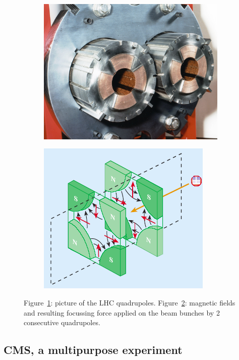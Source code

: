 	\begin{figure}[!h]
		\begin{subfigure}{0.5\linewidth}
			\centering
			\includegraphics[width = 0.5\plotwidth]{fig/chapt2/LHC-quadrupole.jpg}
			\caption{\label{fig:LHCQuadrupole:A}}
		\end{subfigure}
		\begin{subfigure}{0.5\linewidth}
			\centering
			\includegraphics[width = 0.5\plotwidth]{fig/chapt2/LHC-quadrupole-field.png}
			\caption{\label{fig:LHCQuadrupole:B}}
		\end{subfigure}
		\caption{\label{fig:LHCQuadrupole} Figure~\ref{fig:LHCQuadrupole:A}: picture of the LHC quadrupoles. Figure~\ref{fig:LHCQuadrupole:B}: magnetic fields and resulting focussing force applied on the beam bunches by 2 consecutive quadrupoles.}
	\end{figure}

	\subsection{CMS, a multipurpose experiment}
	\label{chapt2:ssec:CMS}

